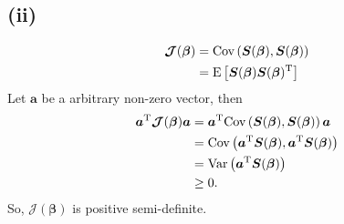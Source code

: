 \subsection*{(ii)}
\begin{align*}
\bm{\mathcal{J}}(\bm{\beta}) &= \mathrm{Cov}\left(\bm{S}(\bm{\beta}),\bm{S}(\bm{\beta})\right)\\
&= \mathrm{E}\left[\bm{S}(\bm{\beta}) \bm{S}(\bm{\beta})^{\rm T}\right]
\end{align*}
Let $\bm{a}$ be a arbitrary non-zero vector, then
\begin{align*}
\bm{a}^{\rm T}\bm{\mathcal{J}}(\bm{\beta})\bm{a} &= \bm{a}^{\rm T}\mathrm{Cov}\left(\bm{S}(\bm{\beta}),\bm{S}(\bm{\beta})\right)\bm{a}\\
&= \mathrm{Cov}\left(\bm{a}^{\rm T}\bm{S}(\bm{\beta}),\bm{a}^{\rm T}\bm{S}(\bm{\beta})\right)\\
&= \mathrm{Var}\left(\bm{a}^{\rm T}\bm{S}(\bm{\beta})\right)\\
&\geq 0.
\end{align*}
So, $\bm{\mathcal{J}}(\bm{\beta})$ is positive semi-definite.
